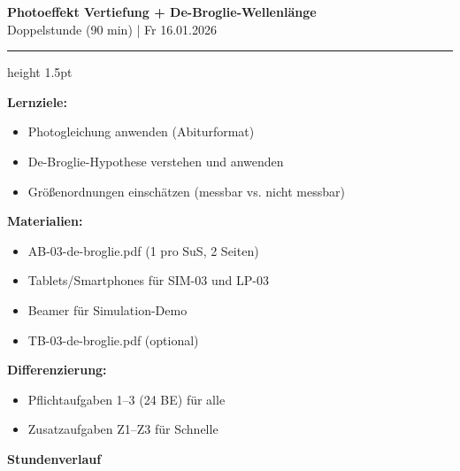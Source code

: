 \documentclass[11pt,a4paper]{article}
\begin{document}

{\Large\textbf{Photoeffekt Vertiefung + De-Broglie-Wellenlänge}}\\[0.3em]
{\normalsize Doppelstunde (90 min) | Fr 16.01.2026}

\vspace{0.3em}
\hrule height 1.5pt
\vspace{0.5em}


\begin{tcolorbox}[lehrerbox={Stundenüberblick}]
\textbf{Lernziele:}
\begin{itemize}[nosep]
\item Photogleichung anwenden (Abiturformat)
\item De-Broglie-Hypothese verstehen und anwenden
\item Größenordnungen einschätzen (messbar vs. nicht messbar)
\end{itemize}

\vspace{0.3em}
\textbf{Materialien:}
\begin{itemize}[nosep]
\item AB-03-de-broglie.pdf (1 pro SuS, 2 Seiten)
\item Tablets/Smartphones für SIM-03 und LP-03
\item Beamer für Simulation-Demo
\item TB-03-de-broglie.pdf (optional)
\end{itemize}

\vspace{0.3em}
\textbf{Differenzierung:}
\begin{itemize}[nosep]
\item Pflichtaufgaben 1--3 (24 BE) für alle
\item Zusatzaufgaben Z1--Z3 für Schnelle
\end{itemize}
\end{tcolorbox}

\vspace{0.5em}


\textbf{Stundenverlauf}
\end{document}
